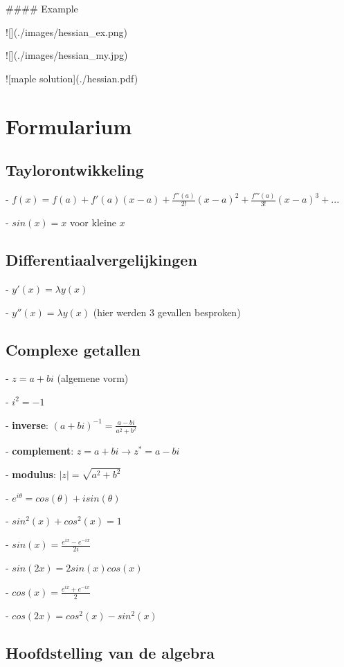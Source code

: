 \documentclass[a4paper]{article}
\begin{document}
#### Example

![](./images/hessian_ex.png)

![](./images/hessian_my.jpg)

![maple solution](./hessian.pdf)

\section*{Formularium}

\subsection*{Taylorontwikkeling}

- $ f(x) = f(a) + f'(a)(x-a) + \frac{f''(a)}{2!}(x-a)^2 + \frac{f'''(a)}{3!}(x-a)^3 + ... $

- $sin(x) = x$ voor kleine $x$

\subsection*{Differentiaalvergelijkingen}

- $y'(x) = \lambda y(x)$

- $y''(x) = \lambda y(x)$ (hier werden 3 gevallen besproken)

\subsection*{Complexe getallen}

- $z = a + bi$ (algemene vorm)

- $i^2 = -1$

- \textbf{inverse}: $(a + bi)^{-1} = \frac{a - bi}{a^2 + b^2}$

- \textbf{complement}: $z = a + bi \rightarrow z^* = a - bi$

- \textbf{modulus}: $|z| = \sqrt{a^2 + b^2}$

- $e^{i\theta} = cos(\theta) + i sin(\theta)$

- $sin^2(x) + cos^2(x) = 1$

- $sin(x) = \frac{e^{ix} - e^{-ix}}{2i}$

- $sin(2x) = 2sin(x)cos(x)$

- $cos(x) = \frac{e^{ix} + e^{-ix}}{2}$

- $cos(2x) = cos^2(x) - sin^2(x)$

\subsection*{Hoofdstelling van de algebra}
\end{document}
